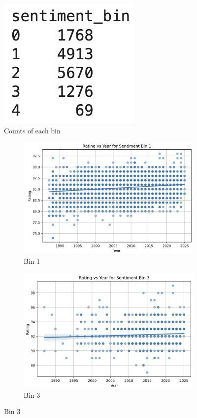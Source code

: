\documentclass{article}
\begin{document}
\begin{figure}
    \centering
    \includegraphics[width=0.3\linewidth]{bins.png}
    \caption{Counts of each bin}
    \label{fig:placeholder}
\end{figure}

\begin{figure}[!ht]
    \centering
    \begin{subfigure}[b]{0.45\linewidth}
        \centering
        \includegraphics[width=\linewidth]{bin1.png}
        \caption{Bin 1}
        \label{fig:bin1}
    \end{subfigure}
    \hfill
    \begin{subfigure}[b]{0.45\linewidth}
        \centering
        \includegraphics[width=\linewidth]{Bin3.png}
        \caption{Bin 3}
        \label{fig:bin3}
    \end{subfigure}


\end{figure}
\end{document}
